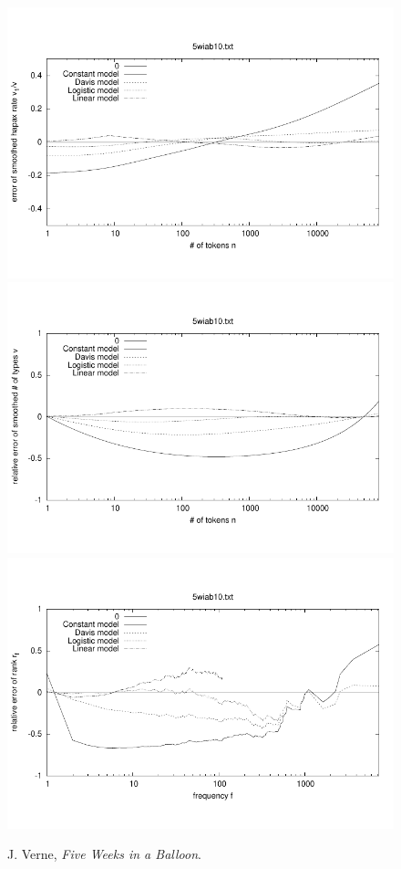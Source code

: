 \documentclass[a4paper,12pt]{article}
\begin{document}
\begin{figure}[p]
  \centering
  \vspace{-2em}
  \includegraphics[width=0.8\columnwidth]{output/herdan/5wiab10_27/token_ratio_residual.pdf}
  \\[-3em]
  \includegraphics[width=0.8\columnwidth]{output/herdan/5wiab10_27/token_residual.pdf}
  \\[-3em]
  \includegraphics[width=0.8\columnwidth]{output/herdan/5wiab10_27/frequency_residual.pdf}
  \vspace{-2em}
  \caption{J. Verne, \emph{Five Weeks in a Balloon}.\label{fig5wiab10R}}
\end{figure}
\end{document}
